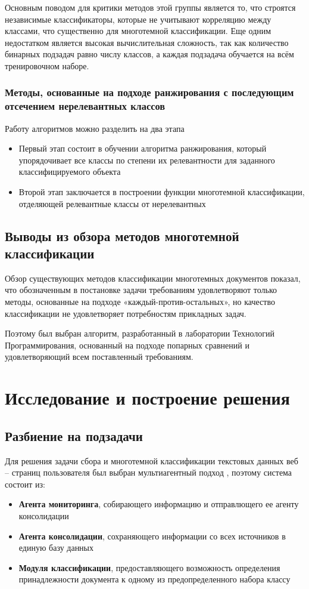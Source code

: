 \documentclass[russian, utf8, emptystyle]{eskdtext}
\begin{document}
Основным поводом для критики методов этой группы является то, что строятся независимые классификаторы, которые не учитывают корреляцию между классами, что существенно для многотемной классификации. Еще одним недостатком является высокая вычислительная сложность, так как количество бинарных подзадач равно числу классов, а каждая подзадача обучается на всём тренировочном наборе. 
\subsubsection{Методы, основанные на подходе ранжирования с последующим отсечением нерелевантных классов}
Работу алгоритмов можно разделить на два этапа
\begin{itemize}
	\item Первый этап состоит в обучении алгоритма ранжирования, который упорядочивает все классы по степени их релевантности для заданного классифицируемого объекта
	\item Второй этап заключается в построении функции многотемной классификации, отделяющей релевантные классы от нерелевантных
\end{itemize}
\subsection {Выводы из обзора методов многотемной классификации}
Обзор существующих методов классификации многотемных документов показал, что обозначенным в постановке задачи требованиям удовлетворяют только методы, основанные на подходе «каждый-против-остальных», но качество классификации не удовлетворяет потребностям прикладных задач. 

Поэтому был выбран алгоритм, разработанный в лаборатории Технологий Программирования, основанный на подходе попарных сравнений и удовлетворяющий всем поставленный требованиям.


\section {Исследование и построение решения}
\subsection{Разбиение на подзадачи}
Для решения задачи сбора и многотемной классификации текстовых данных веб – страниц пользователя был выбран мультиагентный подход \cite{multiagent}, поэтому система состоит из:
\begin{itemize}
		\item {\bf Агента мониторинга}, собирающего информацию и отправлющего ее агенту консолидации
		\item{\bf Агента консолидации}, сохраняющего информации со всех источников в единую базу данных
		\item{\bf Модуля классификации}, предоставляющего возможность определения принадлежности документа к одному из предопределенного набора классу
\end{itemize}
\end{document}

